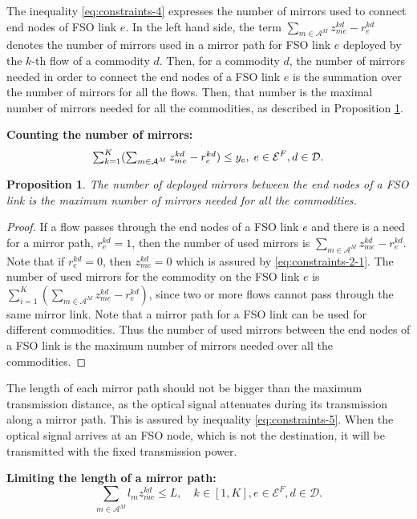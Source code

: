 \documentclass[onecolumn,11pt,draftclsnofoot]{IEEEtran}
\newtheorem{proposition}{Proposition}
\begin{document}
The inequality \eqref{eq:constraints-4} expresses the number of mirrors used to connect end nodes of FSO link $e$. In the left hand side, the term $\sum_{m \in \mathcal A^M} z_{me}^{kd} - r_{e}^{kd}$ denotes the number of mirrors used in a mirror path for FSO link $e$ deployed by the $k$-th flow of a commodity $d$. Then, for a commodity $d$, the number of mirrors needed in order to connect the end nodes of a FSO link $e$ is the summation over the number of mirrors for all the flows. Then, that number is the maximal number of mirrors needed for all the commodities, as described in Proposition \ref{pp:mirrorNum}.

\noindent \textbf{Counting the number of mirrors:}
\begin{equation}\label{eq:constraints-4}
\mbox{$\sum_{k=1}^K (\sum_{m \in \mathcal A^M} z_{me}^{kd} - r_{e}^{kd}) \leq y_{e}$}, \; e \in \mathcal E^{F}, d \in \mathcal D. \\
\end{equation}

\begin{proposition}\label{pp:mirrorNum}
The number of deployed mirrors between the end nodes of a FSO link is the maximum number of mirrors needed for all the commodities.
\end{proposition}
\begin{proof}
If a flow passes through the end nodes of a FSO link $e$ and there is a need for
a mirror path, $r_e^{kd}=1$, then the number of used mirrors is $\sum_{m \in \mathcal A^M} z_{me}^{kd} - r_{e}^{kd}$. Note that if $r_e^{kd}=0$, then $z_{me}^{kd}=0$ which is assured by \eqref{eq:constraints-2-1}.
The number of used mirrors for the commodity on the FSO link $e$ is $\sum_{i=1}^K (\sum_{m \in \mathcal A^M} z_{me}^{kd} - r_{e}^{kd})$, since two or more flows cannot pass through the same mirror link.
Note that a mirror path for a FSO link can be used for different commodities. Thus the number of used mirrors between the end nodes of a FSO link is the maximum number of mirrors needed over all the commodities.
\end{proof}

The length of each mirror path should not be bigger than the maximum transmission distance, as the optical signal attenuates during its transmission along a mirror path. This is assured by inequality \eqref{eq:constraints-5}. When the optical signal arrives at an FSO node, which is not the destination, it will be transmitted with the fixed transmission power.

\noindent \textbf{Limiting the length of a mirror path:}
\begin{equation}\label{eq:constraints-5}
\mbox{$\sum_{m \in \mathcal A^M} l_m z_{me}^{kd} \leq L$}, \quad k \in [1,K], e \in \mathcal E^{F}, d \in \mathcal D.
\end{equation}
\end{document}
